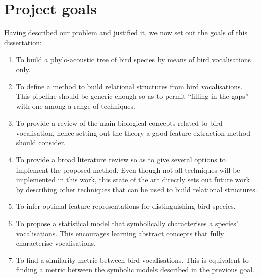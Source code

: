 \documentclass[../main.tex]{subfiles}
\begin{document}
\section{Project goals}
Having described our problem and justified it, we now set out the goals of this dissertation:
\begin{enumerate}
\item To build a phylo-acoustic tree of bird species by means of bird vocalisations only. 
\item To define a method to build relational structures from bird vocalisations. This pipeline should be generic enough so as to permit ``filling in the gaps'' with one among a range of techniques.
\item To provide a review of the main biological concepts related to bird vocalisation, hence setting out the theory a good feature extraction method should consider.
\item To provide a broad literature review so as to give several options to implement the proposed method. Even though not all techniques will be implemented in this work, this state of the art directly sets out future work by describing other techniques that can be used to build relational structures.
\item To infer optimal feature representations for distinguishing bird species.
\item To propose a statistical model that symbolically characterises a species' vocalisations. This encourages learning abstract concepts that fully characterise vocalisations.
\item To find a similarity metric between bird vocalisations. This is equivalent to finding a metric between the symbolic models described in the previous goal.
\end{enumerate}
\end{document}
